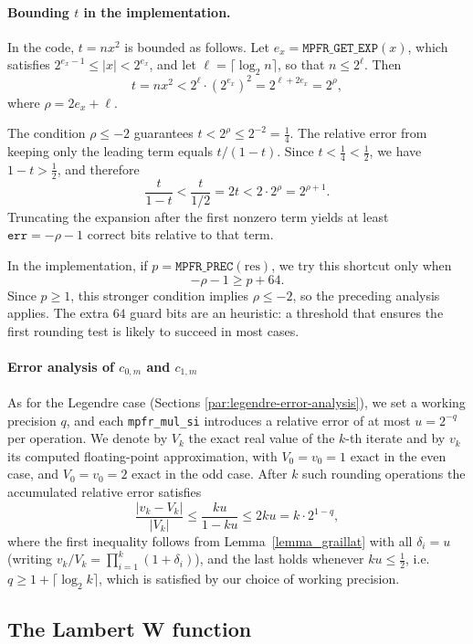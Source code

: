\documentclass[12pt]{amsart}
\begin{document}
\paragraph{\textbf{Bounding $t$ in the implementation.}}
In the code, $t = nx^2$ is bounded as follows.
Let $e_x = \texttt{MPFR\_GET\_EXP}(x)$, which satisfies
$2^{e_x-1} \le |x| < 2^{e_x}$, and let
$\ell = \lceil \log_2 n \rceil$, so that $n \le 2^\ell$.
Then
\[
  t = nx^2 < 2^\ell \cdot \left(2^{e_x}\right)^2
          = 2^{\ell + 2e_x} = 2^\rho,
\]
where $\rho = 2e_x + \ell$.

The condition $\rho \le -2$ guarantees
$t < 2^\rho \le 2^{-2} = \tfrac{1}{4}$.
The relative error from keeping only the leading term equals $t/(1-t)$.
Since $t < \tfrac{1}{4} < \tfrac{1}{2}$, we have $1 - t > \tfrac{1}{2}$,
and therefore
\[
  \frac{t}{1-t} < \frac{t}{1/2} = 2t < 2 \cdot 2^\rho = 2^{\rho+1}.
\]
Truncating the expansion after the first nonzero term yields at least
$\mathtt{err} = -\rho - 1$ correct bits relative to that term.

In the implementation, if $p = \texttt{MPFR\_PREC}(\mathrm{res})$, we try this
shortcut only when
\[
  -\rho - 1 \ge p + 64.
\]
Since $p \ge 1$, this stronger condition implies $\rho \le -2$, so the
preceding analysis applies. The extra $64$ guard bits are an heuristic:
a threshold that ensures the first rounding test is likely to succeed
in most cases.

\paragraph{\textbf{Error analysis of $c_{0,m}$ and $c_{1,m}$}}
As for the Legendre case (Sections \ref{par:legendre-error-analysis}), we set
a working precision $q$, and each \texttt{mpfr\_mul\_si} introduces a relative
error of at most $u = 2^{-q}$ per operation. We denote by $V_k$ the exact real
value of the $k$-th iterate and by $v_k$ its computed floating-point approximation,
with $V_0 = v_0 = 1$ exact in the even case, and $V_0 = v_0 = 2$ exact in the odd
case. After $k$ such rounding
operations the accumulated relative error satisfies
\[
  \frac{|v_k - V_k|}{|V_k|}
  \le \frac{ku}{1-ku}
  \le 2ku = k \cdot 2^{1-q},
\]
where the first inequality follows from Lemma~\ref{lemma_graillat} with all
$\delta_i = u$ (writing $v_k/V_k = \prod_{i=1}^k(1+\delta_i)$), and the last
holds whenever $ku \le \tfrac{1}{2}$, i.e. $q \ge 1 + \lceil\log_2 k\rceil$,
which is satisfied by our choice of working precision.

\subsection{The Lambert W function}
\end{document}
